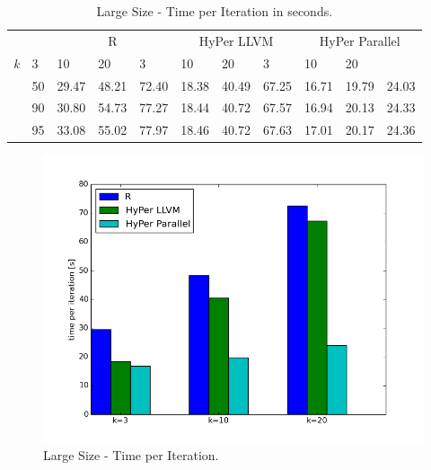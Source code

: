\begin{table}[htsb]
  \caption[Large Size - Time per Iteration]{Large Size - Time per Iteration in seconds.}
  \label{tab:large_final}
  \centering
  \begin{tabular}{l l l l l |l l l |l l l }
    \toprule
      && \multicolumn{3}{c}{R} & \multicolumn{3}{c}{HyPer LLVM} & \multicolumn{3}{c}{HyPer Parallel}  \\
      \emph{k} & 3 & 10 & 20 & 3 & 10 & 20 & 3 & 10 & 20 \\
    \midrule
      \parbox[t]{2mm}{} &50  & 29.47 & 48.21 & 72.40 & 18.38 & 40.49 & 67.25 & 16.71 & 19.79 & 24.03 \\
      &90  & 30.80 & 54.73 & 77.27 & 18.44 & 40.72 & 67.57 & 16.94 & 20.13 & 24.33 \\
      &95  & 33.08 & 55.02 & 77.97 & 18.46 & 40.72 & 67.63 & 17.01 & 20.17 & 24.36 \\
    \bottomrule
  \end{tabular}
\end{table}




\begin{figure}[htsb]
  \centering
  \includegraphics[scale=0.5, trim="0cm 1.5cm 0cm 0cm"]{figures/charts/final_150M}
  \caption[Large Size - Time per Iteration]{Large Size - Time per Iteration.}
  \label{fig:final_150M}
\end{figure}
